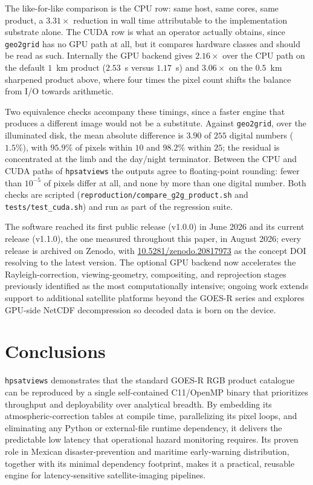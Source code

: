 \documentclass[preprint,12pt]{elsarticle}
\begin{document}
The like-for-like comparison is the CPU row: same host, same cores, same
product, a $3.31\times$ reduction in wall time attributable to the
implementation substrate alone. The CUDA row is what an operator actually
obtains, since \texttt{geo2grid} has no GPU path at all, but it compares
hardware classes and should be read as such. Internally the GPU backend gives
$2.16\times$ over the CPU path on the default $1$~km product ($2.53$~s versus
$1.17$~s) and $3.06\times$ on the $0.5$~km sharpened product above, where four
times the pixel count shifts the balance from I/O towards arithmetic.

Two equivalence checks accompany these timings, since a faster engine that
produces a different image would not be a substitute. Against \texttt{geo2grid},
over the illuminated disk, the mean absolute difference is $3.90$ of $255$
digital numbers ($1.5\%$), with $95.9\%$ of pixels within $10$ and $98.2\%$
within $25$; the residual is concentrated at the limb and the day/night
terminator. Between the CPU and CUDA paths of \texttt{hpsatviews} the outputs
agree to floating-point rounding: fewer than $10^{-5}$ of pixels differ at all,
and none by more than one digital number. Both checks are scripted
(\texttt{reproduction/compare\_g2g\_product.sh} and \texttt{tests/test\_cuda.sh})
and run as part of the regression suite.

The software reached its first public release (v1.0.0) in June 2026 and its
current release (v1.1.0), the one measured throughout this paper, in August
2026; every release is archived on Zenodo, with
\href{https://doi.org/10.5281/zenodo.20817973}{10.5281/zenodo.20817973} as the
concept DOI resolving to the latest version. The optional GPU backend now
accelerates the
Rayleigh-correction, viewing-geometry, compositing, and reprojection stages
previously identified as the most computationally intensive; ongoing work
extends support to additional satellite platforms beyond the GOES-R series and
explores GPU-side NetCDF decompression so decoded data is born on the device.

\section{Conclusions}
\label{sec:conclusions}

\texttt{hpsatviews} demonstrates that the standard GOES-R RGB product
catalogue can be reproduced by a single self-contained C11/OpenMP binary that
prioritizes throughput and deployability over analytical breadth. By embedding
its atmospheric-correction tables at compile time, parallelizing its pixel
loops, and eliminating any Python or external-file runtime dependency, it
delivers the predictable low latency that operational hazard monitoring
requires. Its proven role in Mexican disaster-prevention and maritime
early-warning distribution, together with its minimal dependency footprint,
makes it a practical, reusable engine for latency-sensitive satellite-imaging
pipelines.
\end{document}
